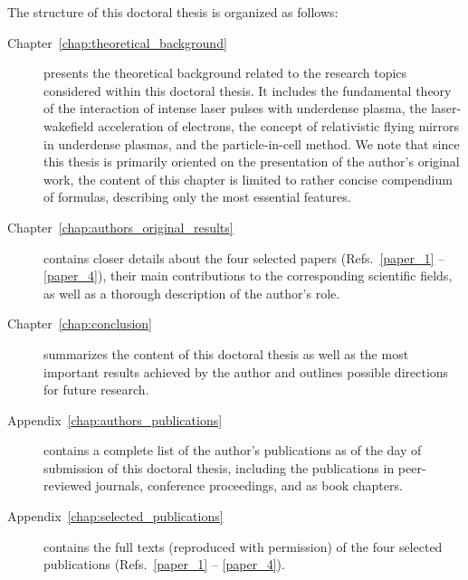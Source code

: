 \documentclass[10pt, a4paper, twoside, openright]{report}
\newcommand{\laplace}[1]{\Delta #1}
\begin{document}
The structure of this doctoral thesis is organized as follows: 

\begin{description}
	\item[Chapter~\ref{chap:theoretical_background}] presents the theoretical background related to the research topics considered within this doctoral thesis. It includes the fundamental theory of the interaction of intense laser pulses with underdense plasma, the laser-wakefield acceleration of electrons, the concept of relativistic flying mirrors in underdense plasmas, and the particle-in-cell method. We note that since this thesis is primarily oriented on the presentation of the author's original work, the content of this chapter is limited to rather concise compendium of formulas, describing only the most essential features. 
	
	\item[Chapter~\ref{chap:authors_original_results}] contains closer details about the four selected papers (Refs.~\ref{paper_1} -- \ref{paper_4}), their main contributions to the corresponding scientific fields, as well as a thorough description of the author's role. 
	
	\item[Chapter~\ref{chap:conclusion}] summarizes the content of this doctoral thesis as well as the most important results achieved by the author and outlines possible directions for future research. 
	
	
	\item[Appendix~\ref{chap:authors_publications}] contains a complete list of the author's publications as of the day of submission of this doctoral thesis, including the publications in peer-reviewed journals, conference proceedings, and as book chapters.
	
	\item[Appendix~\ref{chap:selected_publications}] contains the full texts (reproduced with permission) of the four selected publications (Refs.~\ref{paper_1} -- \ref{paper_4}).
	
\end{description}
	
	
\end{document}
